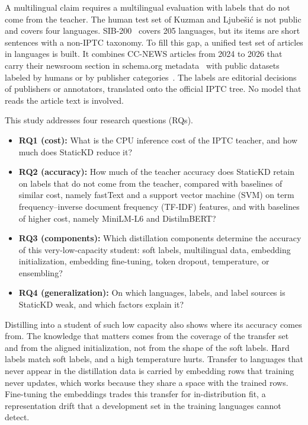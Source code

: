 A multilingual claim requires a multilingual evaluation with labels that do not come from the teacher. The human test set of Kuzman and Ljube\v{s}i\'c is not public and covers four languages. SIB-200~\cite{adelani2024sib200} covers 205 languages, but its items are short sentences with a non-IPTC taxonomy. To fill this gap, a unified test set of  articles in  languages is built. It combines CC-NEWS articles from 2024 to 2026 that carry their newsroom section in schema.org metadata~\cite{guha2016schema} with public datasets labeled by humans or by publisher categories~\cite{adelani2023masakhanews,petukhova2023mnds,mirashi2023indicnews,hossain2025banglanews}. The labels are editorial decisions of publishers or annotators, translated onto the official IPTC tree. No model that reads the article text is involved.

This study addresses four research questions (RQs).
\begin{itemize}
  \item \textbf{RQ1 (cost):} What is the CPU inference cost of the IPTC teacher, and how much does StaticKD reduce it?
  \item \textbf{RQ2 (accuracy):} How much of the teacher accuracy does StaticKD retain on labels that do not come from the teacher, compared with baselines of similar cost, namely fastText and a support vector machine (SVM) on term frequency--inverse document frequency (TF-IDF) features, and with baselines of higher cost, namely MiniLM-L6 and DistilmBERT?
  \item \textbf{RQ3 (components):} Which distillation components determine the accuracy of this very-low-capacity student: soft labels, multilingual data, embedding initialization, embedding fine-tuning, token dropout, temperature, or ensembling?
  \item \textbf{RQ4 (generalization):} On which languages, labels, and label sources is StaticKD weak, and which factors explain it?
\end{itemize}

Distilling into a student of such low capacity also shows where its accuracy comes from. The knowledge that matters comes from the coverage of the transfer set and from the aligned initialization, not from the shape of the soft labels. Hard labels match soft labels, and a high temperature hurts. Transfer to languages that never appear in the distillation data is carried by embedding rows that training never updates, which works because they share a space with the trained rows. Fine-tuning the embeddings trades this transfer for in-distribution fit, a representation drift that a development set in the training languages cannot detect.

